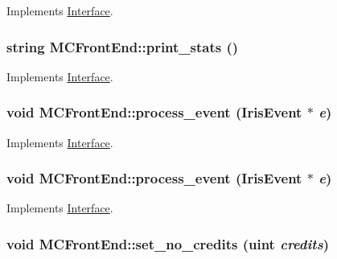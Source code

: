 Implements \hyperlink{classInterface_abfe4b675df488fd5a88d2876cff0ebe}{Interface}.\hypertarget{classMCFrontEnd_38750cc156a8b88225c58b1c08e4f83e}{
\subsubsection[{print\_\-stats}]{\setlength{\rightskip}{0pt plus 5cm}string MCFrontEnd::print\_\-stats ()}}
\label{classMCFrontEnd_38750cc156a8b88225c58b1c08e4f83e}




Implements \hyperlink{classInterface_abfe4b675df488fd5a88d2876cff0ebe}{Interface}.\hypertarget{classMCFrontEnd_cc935494693a9b02addf8ea8c04f81b3}{
\subsubsection[{process\_\-event}]{\setlength{\rightskip}{0pt plus 5cm}void MCFrontEnd::process\_\-event ({\bf IrisEvent} $\ast$ {\em e})}}
\label{classMCFrontEnd_cc935494693a9b02addf8ea8c04f81b3}




Implements \hyperlink{classInterface_baaaeb823b1e0fd7ddc1bb32c2f016fb}{Interface}.\hypertarget{classMCFrontEnd_cc935494693a9b02addf8ea8c04f81b3}{
\subsubsection[{process\_\-event}]{\setlength{\rightskip}{0pt plus 5cm}void MCFrontEnd::process\_\-event ({\bf IrisEvent} $\ast$ {\em e})}}
\label{classMCFrontEnd_cc935494693a9b02addf8ea8c04f81b3}




Implements \hyperlink{classInterface_baaaeb823b1e0fd7ddc1bb32c2f016fb}{Interface}.\hypertarget{classMCFrontEnd_eb0cc4a818d1a8dd1cdc071da8519628}{
\subsubsection[{set\_\-no\_\-credits}]{\setlength{\rightskip}{0pt plus 5cm}void MCFrontEnd::set\_\-no\_\-credits ({\bf uint} {\em credits})}}
\label{classMCFrontEnd_eb0cc4a818d1a8dd1cdc071da8519628}


